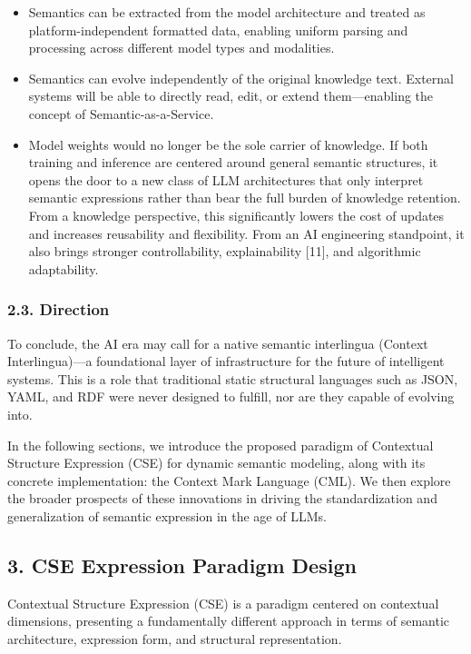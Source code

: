 \documentclass[conference]{IEEEtran}
\begin{document}
\begin{itemize}
\item
  Semantics can be extracted from the model architecture and treated as
  platform-independent formatted data, enabling uniform parsing and
  processing across different model types and modalities.
\item
  Semantics can evolve independently of the original knowledge text.
  External systems will be able to directly read, edit, or extend
  them---enabling the concept of Semantic-as-a-Service.
\item
  Model weights would no longer be the sole carrier of knowledge. If
  both training and inference are centered around general semantic
  structures, it opens the door to a new class of LLM architectures that
  only interpret semantic expressions rather than bear the full burden
  of knowledge retention. From a knowledge perspective, this
  significantly lowers the cost of updates and increases reusability and
  flexibility. From an AI engineering standpoint, it also brings
  stronger controllability, explainability {[}11{]}, and algorithmic
  adaptability.
\end{itemize}

\subsubsection{2.3. Direction}\label{23-direction}

To conclude, the AI era may call for a native semantic interlingua
(Context Interlingua)---a foundational layer of infrastructure for the
future of intelligent systems. This is a role that traditional static
structural languages such as JSON, YAML, and RDF were never designed to
fulfill, nor are they capable of evolving into.

In the following sections, we introduce the proposed paradigm of
Contextual Structure Expression (CSE) for dynamic semantic modeling,
along with its concrete implementation: the Context Mark Language (CML).
We then explore the broader prospects of these innovations in driving
the standardization and generalization of semantic expression in the age
of LLMs.

\subsection{3. CSE Expression Paradigm
Design}\label{3-cse-expression-paradigm-design}

Contextual Structure Expression (CSE) is a paradigm centered on
contextual dimensions, presenting a fundamentally different approach in
terms of semantic architecture, expression form, and structural
representation.
\end{document}
